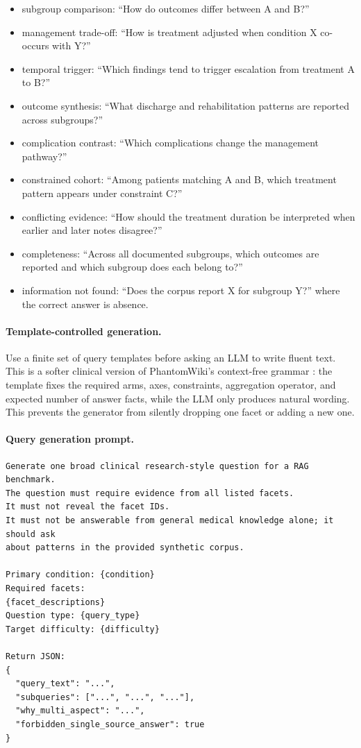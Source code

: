 \documentclass[11pt,a4paper]{article}
\begin{document}
\begin{itemize}[leftmargin=*]
	\item subgroup comparison: ``How do outcomes differ between A and B?''
	\item management trade-off: ``How is treatment adjusted when condition X co-occurs with Y?''
	\item temporal trigger: ``Which findings tend to trigger escalation from treatment A to B?''
	\item outcome synthesis: ``What discharge and rehabilitation patterns are reported across subgroups?''
	\item complication contrast: ``Which complications change the management pathway?''
	\item constrained cohort: ``Among patients matching A and B, which treatment pattern appears under constraint C?''
	\item conflicting evidence: ``How should the treatment duration be interpreted when earlier and later notes disagree?''
	\item completeness: ``Across all documented subgroups, which outcomes are reported and which subgroup does each belong to?''
	\item information not found: ``Does the corpus report X for subgroup Y?'' where the correct answer is absence.
\end{itemize}

\paragraph{Template-controlled generation.}
Use a finite set of query templates before asking an LLM to write fluent text. This is a softer clinical version of PhantomWiki's context-free grammar \citep{gong2025phantomwiki}: the template fixes the required arms, axes, constraints, aggregation operator, and expected number of answer facts, while the LLM only produces natural wording. This prevents the generator from silently dropping one facet or adding a new one.

\paragraph{Query generation prompt.}

\begin{lstlisting}[style=promptstyle]
Generate one broad clinical research-style question for a RAG benchmark.
The question must require evidence from all listed facets.
It must not reveal the facet IDs.
It must not be answerable from general medical knowledge alone; it should ask
about patterns in the provided synthetic corpus.

Primary condition: {condition}
Required facets:
{facet_descriptions}
Question type: {query_type}
Target difficulty: {difficulty}

Return JSON:
{
  "query_text": "...",
  "subqueries": ["...", "...", "..."],
  "why_multi_aspect": "...",
  "forbidden_single_source_answer": true
}
\end{lstlisting}
\end{document}
